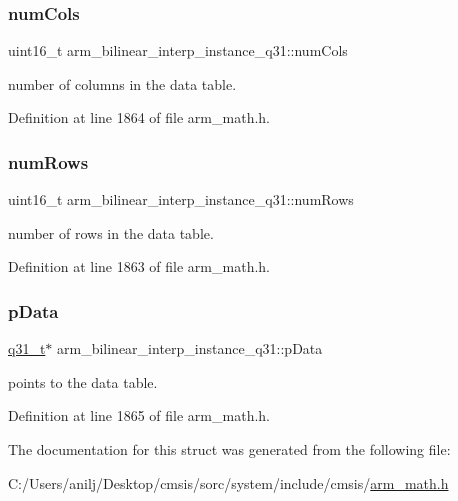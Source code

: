 \subsubsection{\texorpdfstring{num\+Cols}{numCols}}
{\footnotesize\ttfamily uint16\+\_\+t arm\+\_\+bilinear\+\_\+interp\+\_\+instance\+\_\+q31\+::num\+Cols}

number of columns in the data table. 

Definition at line 1864 of file arm\+\_\+math.\+h.

\mbox{\label{structarm__bilinear__interp__instance__q31_a2082e3eac56354d75291f03e96ce4aa5}} 
\subsubsection{\texorpdfstring{num\+Rows}{numRows}}
{\footnotesize\ttfamily uint16\+\_\+t arm\+\_\+bilinear\+\_\+interp\+\_\+instance\+\_\+q31\+::num\+Rows}

number of rows in the data table. 

Definition at line 1863 of file arm\+\_\+math.\+h.

\mbox{\label{structarm__bilinear__interp__instance__q31_a843eae0c9db5f815e77e1aaf9afea358}} 
\subsubsection{\texorpdfstring{p\+Data}{pData}}
{\footnotesize\ttfamily \hyperlink{arm__math_8h_adc89a3547f5324b7b3b95adec3806bc0}{q31\+\_\+t}$\ast$ arm\+\_\+bilinear\+\_\+interp\+\_\+instance\+\_\+q31\+::p\+Data}

points to the data table. 

Definition at line 1865 of file arm\+\_\+math.\+h.



The documentation for this struct was generated from the following file\+:\begin{DoxyCompactItemize}
\item 
C\+:/\+Users/anilj/\+Desktop/cmsis/sorc/system/include/cmsis/\hyperlink{arm__math_8h}{arm\+\_\+math.\+h}\end{DoxyCompactItemize}
